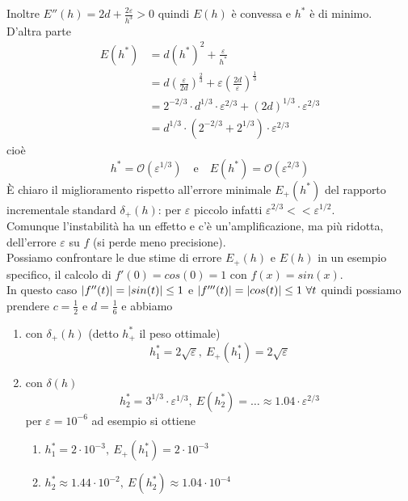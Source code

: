 \documentclass[12pt,a4paper]{article}
\DeclarePairedDelimiter{\abs}{\lvert}{\rvert}
\begin{document}
Inoltre $E''(h) = 2d + \frac{2\varepsilon}{h^3} > 0$ quindi $E(h)$ è convessa e $h^*$ è di minimo.\\
D'altra parte
\[
\begin{split}
    E(h^*) & = d(h^*)^2 + \frac{\varepsilon}{h^*} \\
    & = d(\frac{\varepsilon}{2d})^{\frac{2}{3}} + \varepsilon(\frac{2d}{\varepsilon})^{\frac{1}{3}} \\
    & = 2^{-2/3} \cdot d^{1/3} \cdot \varepsilon^{2/3} + (2d)^{1/3} \cdot \varepsilon^{2/3} \\
    & = d^{1/3} \cdot (2^{-2/3} + 2^{1/3}) \cdot \varepsilon^{2/3}
\end{split}
\]
cioè
\[
h^* = \mathcal{O}(\varepsilon^{1/3}) \quad \text{e} \quad E(h^*) = \mathcal{O}(\varepsilon^{2/3})
\]
È chiaro il miglioramento
rispetto all'errore minimale $E_+(h^*)$ del rapporto incrementale standard $\delta_+(h)$: per $\varepsilon$ piccolo infatti $\varepsilon^{2/3} << \varepsilon^{1/2}$.\\
Comunque l'instabilità ha un effetto e c'è un'amplificazione, ma più ridotta, dell'errore $\varepsilon$ su $f$ (si perde meno precisione).\\
Possiamo confrontare le due stime di errore $E_+(h)$ e $E(h)$ in un esempio specifico, il calcolo di $f'(0) = cos(0) = 1$ con $f(x) = sin(x)$.\\
In questo caso $\abs{f''(t)} = \abs{sin(t)} \le 1$
e $\abs{f'''(t)} = \abs{cos(t)} \le 1 \ \forall t$ quindi possiamo prendere $c = \frac{1}{2}$ e $d = \frac{1}{6}$ e abbiamo
\begin{enumerate}
    \item con $\delta_+(h)$ (detto $h_+^*$ il peso ottimale)
    \[
        h_1^* = 2 \sqrt{\varepsilon}, \ E_+(h_1^*) = 2 \sqrt{\varepsilon}
    \]
    \item con $\delta(h)$
    \[
        h_2^* = 3^{1/3} \cdot \varepsilon^{1/3}, \ E(h_2^*) = \dotso \approx 1.04 \cdot \varepsilon^{2/3}
    \]
    per $\varepsilon = 10^{-6}$ ad esempio si ottiene
    \begin{enumerate}
        \item $h_1^* = 2 \cdot 10^{-3}, \ E_+(h_1^*) = 2 \cdot 10^{-3}$
        \item $h_2^* \approx 1.44 \cdot 10^{-2}, \ E(h_2^*) \approx 1.04 \cdot 10^{-4}$
    \end{enumerate}
\end{enumerate}
\end{document}
